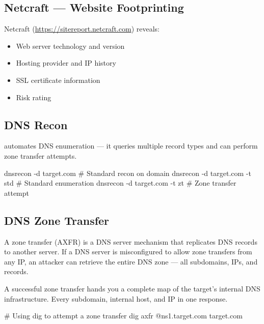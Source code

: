 \begin{takebox}
\begin{whybox}
\begin{notebox}
\subsection{Netcraft --- Website Footprinting}

Netcraft (\url{https://sitereport.netcraft.com}) reveals:
\begin{itemize}
  \item Web server technology and version
  \item Hosting provider and IP history
  \item SSL certificate information
  \item Risk rating
\end{itemize}

\subsection{DNS Recon}
\label{subsec:dns_recon}

 automates DNS enumeration --- it queries multiple record types and
can perform zone transfer attempts.

\begin{termbox}
dnsrecon -d target.com           # Standard recon on domain
dnsrecon -d target.com -t std    # Standard enumeration
dnsrecon -d target.com -t zt     # Zone transfer attempt
\end{termbox}


\subsection{DNS Zone Transfer}
\label{subsec:zone_transfer}

A zone transfer (AXFR) is a DNS server mechanism that replicates DNS records to
another server. If a DNS server is misconfigured to allow zone transfers from any
IP, an attacker can retrieve the entire DNS zone --- all subdomains, IPs, and records.

\begin{whybox}
A successful zone transfer hands you a complete map of the target's internal DNS
infrastructure. Every subdomain, internal host, and IP in one response.
\end{whybox}

\begin{termbox}
# Using dig to attempt a zone transfer
dig axfr @ns1.target.com target.com


\end{termbox}
\end{notebox}
\end{whybox}
\end{takebox}
